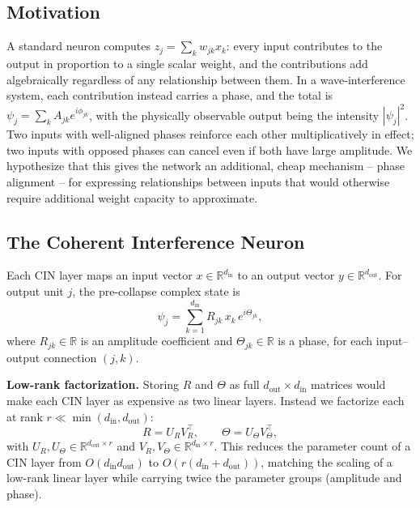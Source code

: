 \documentclass[11pt]{article}
\begin{document}
\subsection{Motivation}
A standard neuron computes $z_j = \sum_k w_{jk} x_k$: every input contributes to the output in proportion to a single scalar weight, and the contributions add algebraically regardless of any relationship between them. In a wave-interference system, each contribution instead carries a phase, and the total is $\psi_j = \sum_k A_{jk} e^{i\phi_{jk}}$, with the physically observable output being the intensity $|\psi_j|^2$. Two inputs with well-aligned phases reinforce each other multiplicatively in effect; two inputs with opposed phases can cancel even if both have large amplitude. We hypothesize that this gives the network an additional, cheap mechanism -- phase alignment -- for expressing relationships between inputs that would otherwise require additional weight capacity to approximate.

\subsection{The Coherent Interference Neuron}
Each CIN layer maps an input vector $x \in \mathbb{R}^{d_{\text{in}}}$ to an output vector $y \in \mathbb{R}^{d_{\text{out}}}$. For output unit $j$, the pre-collapse complex state is
\begin{equation}
    \psi_j = \sum_{k=1}^{d_{\text{in}}} R_{jk} \, x_k \, e^{i \Theta_{jk}},
    \label{eq:psi}
\end{equation}
where $R_{jk} \in \mathbb{R}$ is an amplitude coefficient and $\Theta_{jk} \in \mathbb{R}$ is a phase, for each input--output connection $(j,k)$.

\textbf{Low-rank factorization.} Storing $R$ and $\Theta$ as full $d_{\text{out}} \times d_{\text{in}}$ matrices would make each CIN layer as expensive as two linear layers. Instead we factorize each at rank $r \ll \min(d_{\text{in}}, d_{\text{out}})$:
\begin{equation}
    R = U_R V_R^\top, \qquad \Theta = U_\Theta V_\Theta^\top,
\end{equation}
with $U_R, U_\Theta \in \mathbb{R}^{d_{\text{out}} \times r}$ and $V_R, V_\Theta \in \mathbb{R}^{d_{\text{in}} \times r}$. This reduces the parameter count of a CIN layer from $O(d_{\text{in}} d_{\text{out}})$ to $O(r (d_{\text{in}} + d_{\text{out}}))$, matching the scaling of a low-rank linear layer while carrying twice the parameter groups (amplitude and phase).
\end{document}
